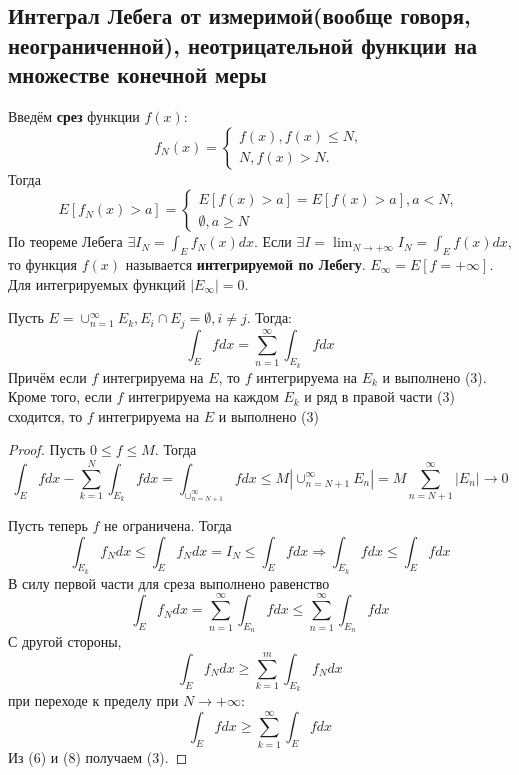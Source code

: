 \documentclass[11pt]{article}
\def\zall{\setcounter{lem}{0}\setcounter{cnsqnc}{0}\setcounter{th}{0}\setcounter{Cmt}{0}\setcounter{equation}{0}\setcounter{stnmt}{0}}
\newcounter{lem}\setcounter{lem}{0}
\newcounter{stnmt}\setcounter{stnmt}{0}
\newcounter{th}\setcounter{th}{0}
\def\th{\par\smallskip\refstepcounter{th}\textbf{\arabic{th}}}
\newtheorem*{Theorem}{Теорема \th}
\newcounter{cnsqnc}\setcounter{cnsqnc}{0}
\newcounter{Cmt}\setcounter{Cmt}{0}
\begin{document}
\subsection{Интеграл Лебега от измеримой(вообще говоря, неограниченной), неотрицательной функции на множестве конечной меры}
\label{sec:org913abcc}
Введём \textbf{срез} функции \(f(x)\):
\zall
\begin{equation}
f_N(x) = \begin{cases}
f(x), f(x) \leq N, \\
N, f(x) > N.
\end{cases}
\end{equation}
Тогда
\begin{equation}
E[f_N(x) > a] = \begin{cases}
E[f(x) > a] = E[f(x) > a], a < N, \\
\emptyset, a \geq N
\end{cases}
\end{equation}
По теореме Лебега $\exists I_N = \int_Ef_N(x)dx$. Если
$\exists I = \lim_{N \to +\infty}I_N = \int_Ef(x)dx$, то функция $f(x)$ называется \textbf{интегрируемой
по Лебегу}. $E_{\infty} = E[f = +\infty]$. Для интегрируемых функций $|E_{\infty}| = 0$.
\begin{Theorem}
Пусть $E = \cup_{n = 1}^{\infty}E_k, E_i \cap E_j = \emptyset, i \neq j$. Тогда:
\begin{equation}
\int_Efdx = \sum_{n = 1}^{\infty}\int_{E_k}fdx
\end{equation}
Причём если $f$ интегрируема на $E$, то $f$ интегрируема на $E_k$ и выполнено (3). Кроме того,
если $f$ интегрируема на каждом $E_k$ и ряд в правой части (3) сходится, то $f$ интегрируема
на $E$ и выполнено (3)
\end{Theorem}
\begin{proof}
Пусть $0 \leq f \leq M$. Тогда
\begin{equation}
\int_Efdx - \sum_{k = 1}^N\int_{E_k}fdx = \int_{\cup_{n = N + 1}^{\infty}}fdx \leq M|\cup_{n = N + 1}^{\infty}E_n|
= M\sum_{n = N + 1}^{\infty}|E_n| \to 0
\end{equation}

Пусть теперь $f$ не ограничена. Тогда
\begin{equation}
\int_{E_k}f_Ndx \leq \int_Ef_Ndx = I_N \leq \int_Efdx \Rightarrow \int_{E_k}fdx \leq \int_Efdx
\end{equation}
В силу первой части для среза выполнено равенство
\begin{equation}
\int_Ef_Ndx = \sum_{n = 1}^{\infty}\int_{E_n}fdx \leq \sum_{n = 1}^{\infty}\int_{E_n}fdx
\end{equation}
С другой стороны,
\begin{equation}
\int_Ef_Ndx \geq \sum_{k = 1}^m\int_{E_k}f_Ndx
\end{equation}
при переходе к пределу при $N \to +\infty$:
\begin{equation}
\int_Efdx \geq \sum_{k = 1}^{\infty}\int_Efdx
\end{equation}
Из (6) и (8) получаем (3).
\end{proof}
\end{document}
